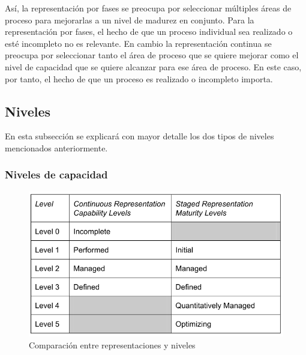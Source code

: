 \begin{itemize}
Así, la representación por fases se preocupa por seleccionar múltiples áreas de proceso para mejorarlas a un nivel de madurez en conjunto. Para la representación por fases, el hecho de que un proceso individual sea realizado o esté incompleto no es relevante. En cambio la representación continua se preocupa por seleccionar tanto el área de proceso que se quiere mejorar como el nivel de capacidad que se quiere alcanzar para ese área de proceso. En este caso, por tanto, el hecho de que un proceso es realizado o incompleto importa.


\subsection{Niveles}
En esta subsección se explicará con mayor detalle los dos tipos de niveles mencionados anteriormente.

\subsubsection{Niveles de capacidad}



\begin{figure}[h]
	\centering
	\includegraphics[scale=1]{Images/comparison.PNG}
	\caption{Comparación entre representaciones y niveles}
	\label{fig:comparison}
\end{figure}

		 
\end{itemize}